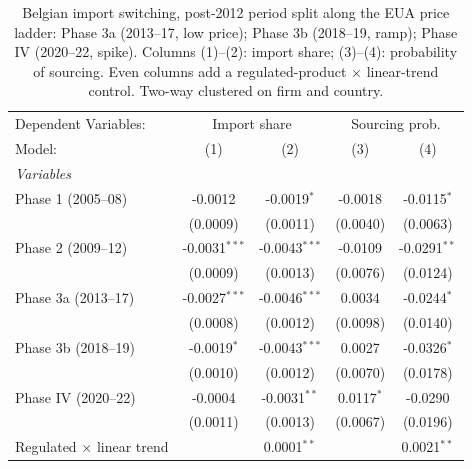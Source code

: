 
\begin{table}[htbp]
   \caption{\label{tab:cdgm_postmsr_finer} Belgian import switching, post-2012 period split along the EUA price ladder: Phase 3a (2013--17, low price); Phase 3b (2018--19, ramp); Phase IV (2020--22, spike). Columns (1)--(2): import share; (3)--(4): probability of sourcing. Even columns add a regulated-product $\times$ linear-trend control. Two-way clustered on firm and country.}
   \centering
   \begin{tabular}{lcccc}
      \tabularnewline \midrule \midrule
      Dependent Variables: & \multicolumn{2}{c}{Import share} & \multicolumn{2}{c}{Sourcing prob.}\\
      Model:                                   & (1)             & (2)             & (3)          & (4)\\  
      \midrule
      \emph{Variables}\\
      Phase 1 (2005--08)                       & -0.0012         & -0.0019$^{*}$   & -0.0018      & -0.0115$^{*}$\\   
                                               & (0.0009)        & (0.0011)        & (0.0040)     & (0.0063)\\   
      Phase 2 (2009--12)                       & -0.0031$^{***}$ & -0.0043$^{***}$ & -0.0109      & -0.0291$^{**}$\\   
                                               & (0.0009)        & (0.0013)        & (0.0076)     & (0.0124)\\   
      Phase 3a (2013--17)                      & -0.0027$^{***}$ & -0.0046$^{***}$ & 0.0034       & -0.0244$^{*}$\\   
                                               & (0.0008)        & (0.0012)        & (0.0098)     & (0.0140)\\   
      Phase 3b (2018--19)                      & -0.0019$^{*}$   & -0.0043$^{***}$ & 0.0027       & -0.0326$^{*}$\\   
                                               & (0.0010)        & (0.0012)        & (0.0070)     & (0.0178)\\   
      Phase IV (2020--22)                      & -0.0004         & -0.0031$^{**}$  & 0.0117$^{*}$ & -0.0290\\   
                                               & (0.0011)        & (0.0013)        & (0.0067)     & (0.0196)\\   
      Regulated $\times$ linear trend          &                 & 0.0001$^{**}$   &              & 0.0021$^{**}$\\   

\end{tabular}
\end{table}
